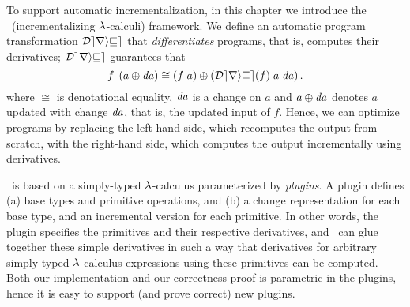 To support automatic incrementalization, in this chapter we introduce the \ILC\
(incrementalizing $\lambda$-calculi) framework. We define
an automatic program transformation $\mathcal{Derive}$
that \emph{differentiates} programs, that is, computes their
derivatives; $\mathcal{Derive}$ guarantees that
\begin{equation}
  \label{eq:correctness}
\App{f}{\Apply*{\D a}{a}}
\cong
\Apply{\App*{\App{\Derive{f}}{a}}{\D a}}{\App*{f}{a}}.
\end{equation}
where
$\cong$ is denotational equality,
$\mathit{da}$ is a change on $a$ and $\Apply{\D a}{a}$ denotes $a$
updated with change $\mathit{da}$, that is, the updated input of $f$.
Hence, we can optimize programs by replacing the left-hand side,
which recomputes the output from scratch, with the right-hand
side, which computes the output incrementally using derivatives.

\ILC\ is based on a simply-typed $\lambda$-calculus
parameterized by \emph{plugins}. A plugin
defines
%
(a) base types and primitive operations, and
%
(b) a change representation for each base type, and an
incremental version for each primitive. In other words, the plugin
specifies the primitives and their respective derivatives, and
\ILC\ can glue together these simple derivatives in such a way
that derivatives for arbitrary simply-typed $\lambda$-calculus expressions
using these primitives can be computed. Both our implementation and our correctness proof 
is parametric in the plugins, hence it is easy to support (and prove correct)
new plugins.

